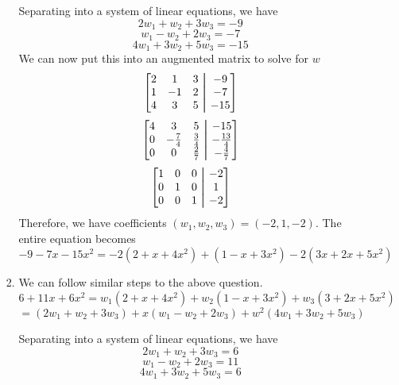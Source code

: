\documentclass[11pt, letterpaper, twoside]{article}
\newcommand\aug{\fboxsep=-\fboxrule\!\!\!\fbox{\strut}\!\!\!} %
\begin{document}
\begin{enumerate}
\begin{enumerate}[label=\alph*)]
\begin{enumerate}[label=\roman*)]
Separating into a system of linear equations, we have 
\[2w_1+w_2+3w_3=-9\]
\[w_1-w_2+2w_3=-7\]
\[4w_1+3w_2+5w_3=-15\]
We can now put this into an augmented matrix to solve for \(w\)
\[\begin{bmatrix}
    2&1&3&\aug&-9\\
    1&-1&2&\aug&-7\\
    4&3&5&\aug&-15
\end{bmatrix}\]
\[\begin{bmatrix}
    4&3&5&\aug& -15\\
    0&-\frac{7}{4}&\frac{3}{4}&\aug&-\frac{13}{4}\\
    0&0&\frac{2}{7}&\aug&-\frac{4}{7}
\end{bmatrix}\]
\[\begin{bmatrix}
    1&0&0&\aug&-2\\
    0&1&0&\aug&1\\
    0&0&1&\aug&-2
\end{bmatrix}\]
Therefore, we have coefficients \((w_1, w_2, w_3)=(-2, 1, -2)\). 
The entire equation becomes \(-9-7x-15x^2=-2(2+x+4x^2)+(1-x+3x^2)-2(3x+2x+5x^2)\)

\item We can follow similar steps to the above question.
\[6+11x+6x^2=w_1(2+x+4x^2)+w_2(1-x+3x^2)+w_3(3+2x+5x^2)\]
\[=(2w_1+w_2+3w_3)+x(w_1-w_2+2w_3)+w^2(4w_1+3w_2+5w_3)\]

Separating into a system of linear equations, we have 
\[2w_1+w_2+3w_3=6\]
\[w_1-w_2+2w_3=11\]
\[4w_1+3w_2+5w_3=6\]


\end{enumerate}
\end{enumerate}
\end{enumerate}
\end{document}
